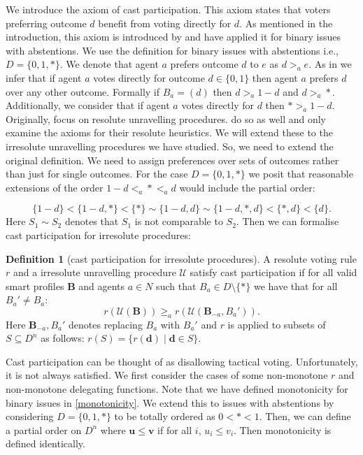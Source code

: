 \documentclass[11pt,a4paper, titlepage]{article}
\theoremstyle{definition}
\newtheorem{definition}[theorem]{Definition}
\let\vec\mathbf
\begin{document}
We introduce the axiom of cast participation. This axiom states that voters preferring outcome $d$ benefit from voting directly for $d$. 
As mentioned in the introduction, this axiom is introduced by \cite{kotsialou} and \cite{grandi} have applied it for binary issues with abstentions. 
We use the definition for binary issues with abstentions i.e., $D = \{0, 1, *\}$.
We denote that agent $a$ prefers outcome $d$ to $e$ as $d >_a e$. As in \citeauthor{grandi} we infer that if agent $a$ votes directly for outcome $d \in \{0, 1\}$ then agent $a$ prefers $d$ over any other outcome. 
Formally if $B_a = (d)$ then $ d >_a 1-d$ and $d >_a *$.
Additionally, we consider that if agent $a$ votes directly for $d$ then $* >_a 1-d$. 
Originally, \citeauthor{kotsialou} focus on resolute unravelling procedures. \citeauthor{grandi} do so as well and only examine the axioms for their resolute heuristics.
We will extend these to the irresolute unravelling procedures we have studied.
So, we need to extend the original definition. 
We need to assign preferences over sets of outcomes rather than just for single outcomes.
For the case $D = \{0, 1, *\}$ we posit that reasonable extensions of the order $1-d <_a * <_a d$ would include the partial order:

\[
    \{1-d\} < \{1-d, *\} < \{*\} \sim \{1-d, d\} \sim \{1-d, *, d\} < \{*, d \}< \{d\}.
\]
Here $S_1 \sim S_2$ denotes that $S_1$ is not comparable to $S_2$.
Then we can formalise cast participation for irresolute procedures:

\begin{definition}[cast participation for irresolute procedures]
    A resolute voting rule $r$ and a irresolute unravelling procedure $\mathcal{U}$ satisfy cast participation if for all valid smart profiles $\mathbf{B}$ and agents $a \in N$ such that $B_a \in D \setminus \{*\}$ we have that for all $B_a' \neq B_a$:
    \[
        r(\mathcal{U}(\mathbf{B})) \geq_a r(\mathcal{U}(\mathbf{B}_{-a}, B_a')).
    \]
    Here $\mathbf{B}_{-a}, B_a'$ denotes replacing $B_a$ with $B_a'$ and $r$ is applied to subsets of $S \subseteq D^n$ as follows: $r(S) = \{r(\vec{d}) \mid \vec{d} \in S\}$.
\end{definition}

Cast participation can be thought of as disallowing tactical voting. Unfortunately, it is not always satisfied. 
We first consider the cases of some non-monotone $r$ and non-monotone delegating functions. 
Note that we have defined monotonicity for binary issues in \cref{monotonicity}. 
We extend this to issues with abstentions by considering $D = \{0, 1, *\}$ to be totally ordered as $0 < * < 1$.
Then, we can define a partial order on $D^n$ where $\vec{u} \leq \vec{v}$ if for all $i$, $u_i \leq v_i$. Then monotonicity is defined identically.
\end{document}
